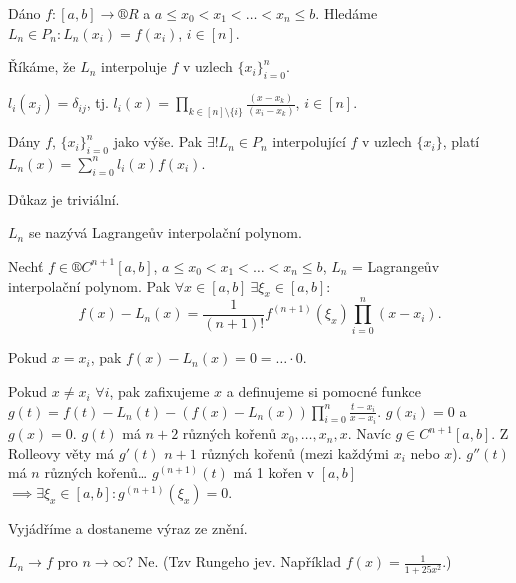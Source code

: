 \documentclass[12pt]{article}					%
\begin{document}
\begin{definice}
	Dáno $f: [a, b] \rightarrow ®R$ a $a ≤ x_0 < x_1 < … < x_n ≤ b$. Hledáme $L_n \in P_n: L_n(x_i) = f(x_i)$, $i \in [n]$.

	\begin{definicein}
		Říkáme, že $L_n$ interpoluje $f$ v uzlech $\{x_i\}_{i=0}^n$.
	\end{definicein}

	\begin{definicein}
		$l_i(x_j) = \delta_{ij}$, tj. $l_i(x) = \prod_{k\in [n] \setminus \{i\}} \frac{(x - x_k)}{(x_i - x_k)}$, $i \in [n]$.
	\end{definicein}

	\begin{vetain}
		Dány $f$, $\{x_i\}_{i=0}^n$ jako výše. Pak $\exists ! L_n \in P_n$ interpolující $f$ v uzlech $\{x_i\}$, platí $L_n(x) = \sum_{i=0}^n l_i(x) f(x_i)$.

		Důkaz je triviální.
	\end{vetain}

	$L_n$ se nazývá Lagrangeův interpolační polynom.
\end{definice}

\begin{veta}
	Nechť $f \in ®C^{n+1}[a, b]$, $a ≤ x_0 < x_1 < … < x_n ≤ b$, $L_n$ = Lagrangeův interpolační polynom. Pak $\forall x \in [a, b]\ \exists \xi_x \in [a, b]:$
	$$ f(x) - L_n(x) = \frac{1}{(n+1)!} f^{(n+1)}(\xi_x) \prod_{i=0}^n (x - x_i). $$

	\begin{dukazin}
		Pokud $x = x_i$, pak $f(x) - L_n(x) = 0 = …·0$.

		Pokud $x ≠ x_i$ $\forall i$, pak zafixujeme $x$ a definujeme si pomocné funkce $g(t) = f(t) - L_n(t) - (f(x) - L_n(x)) \prod_{i=0}^n \frac{t - x_i}{x - x_i}$. $g(x_i) = 0$ a $g(x) = 0$. $g(t)$ má $n+2$ různých kořenů $x_0, …, x_n, x$. Navíc $g \in C^{n+1}[a, b]$. Z Rolleovy věty má $g'(t)$ $n+1$ různých kořenů (mezi každými $x_i$ nebo $x$). $g''(t)$ má $n$ různých kořenů… $g^{(n+1)}(t)$ má 1 kořen v $[a, b]$ $\implies \exists \xi_x \in [a, b]: g^{(n+1)}(\xi_x) = 0$.

		Vyjádříme a dostaneme výraz ze znění.
	\end{dukazin}
\end{veta}

\begin{poznamka}[Konvergence]
	$L_n \rightarrow f$ pro $n \rightarrow ∞$? Ne. (Tzv Rungeho jev. Například $f(x) = \frac{1}{1 + 25x^2}$.)
\end{poznamka}
\end{document}
